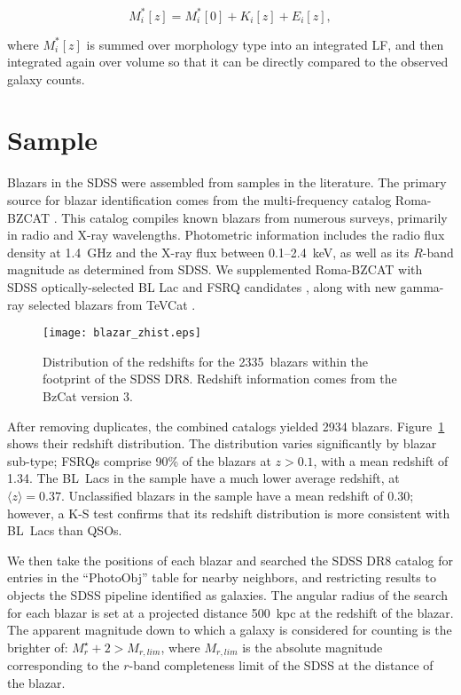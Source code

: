\documentclass{emulateapj}
\begin{document}
\begin{equation}
\label{eqn-mstar_morph}
M_i^*[z] = M_i^*[0] + K_i[z] + E_i[z],
\end{equation}

\noindent where $M_i^*[z]$ is summed over morphology type into an integrated LF, and then integrated again over volume so that it can be directly compared to the observed galaxy counts. 


\section{Sample}\label{sec-sample}

Blazars in the SDSS were assembled from samples in the literature. The primary source for blazar identification comes from the multi-frequency catalog Roma-BZCAT \citep{mas09}. This catalog compiles known blazars from numerous surveys, primarily in radio and X-ray wavelengths. Photometric information includes the radio flux density at 1.4~GHz and the X-ray flux between 0.1--2.4~keV, as well as its $R$-band magnitude as determined from SDSS. We supplemented Roma-BZCAT with SDSS optically-selected BL Lac \citep{plo10} and FSRQ candidates \citep{che09a}, along with new gamma-ray selected blazars from TeVCat \citep{hor08}. 

\begin{figure}
\texttt{[image: blazar\_zhist.eps]}
\caption{Distribution of the redshifts for the 2335~blazars within the footprint of the SDSS DR8. Redshift information comes from the BzCat version 3.  
\label{fig-blazar_zhist}}
\end{figure}

After removing duplicates, the combined catalogs yielded 2934 blazars. Figure~\ref{fig-blazar_zhist} shows their redshift distribution. The distribution varies significantly by blazar sub-type; FSRQs comprise 90\% of the blazars at $z>0.1$, with a mean redshift of 1.34. The BL~Lacs in the sample have a much lower average redshift, at $\langle z\rangle=0.37$. Unclassified blazars in the sample \citep[``QSO candidates'', as defined by][]{mas09} have a mean redshift of 0.30; however, a K-S test confirms that its redshift distribution is more consistent with BL~Lacs than QSOs. 

We then take the positions of each blazar and searched the SDSS DR8 catalog \citep{eis11} for entries in the ``PhotoObj'' table for nearby neighbors, and restricting results to objects the SDSS pipeline identified as galaxies. The angular radius of the search for each blazar is set at a projected distance 500~kpc at the redshift of the blazar. The apparent magnitude down to which a galaxy is considered for counting is the brighter of: $M_r^\star + 2 > M_{r,lim}$, where $M_{r,lim}$ is the absolute magnitude corresponding to the $r$-band completeness limit of the SDSS at the distance of the blazar. 
\end{document}
